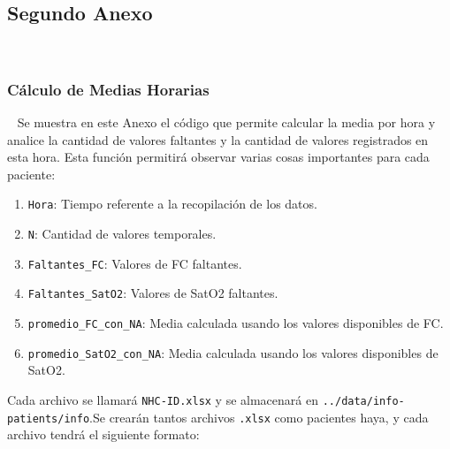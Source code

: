 \subsection{Segundo Anexo}~\label{sec:anexo2}

\subsubsection{Cálculo de Medias Horarias}~\label{sec:calculo-medias-horarias}
Se muestra en este Anexo el código que permite calcular la media por hora y analice la cantidad de valores faltantes y la cantidad de valores registrados en esta hora. Esta función permitirá observar varias cosas importantes para cada paciente:

\begin{enumerate}
    \item \texttt{Hora}: Tiempo referente a la recopilación de los datos.
    
    \item \texttt{N}: Cantidad de valores temporales.
    
    \item \texttt{Faltantes\_FC}: Valores de FC faltantes.
    
    \item \texttt{Faltantes\_SatO2}: Valores de SatO2 faltantes.
    
    \item \texttt{promedio\_FC\_con\_NA}: Media calculada usando los valores disponibles de FC.
    
    \item \texttt{promedio\_SatO2\_con\_NA}: Media calculada usando los valores disponibles de SatO2.
\end{enumerate}

Cada archivo se llamará \texttt{NHC-ID.xlsx} y se almacenará en \texttt{../data/info-patients/info}.Se crearán tantos archivos \texttt{.xlsx} como pacientes haya, y cada archivo tendrá el siguiente formato:


